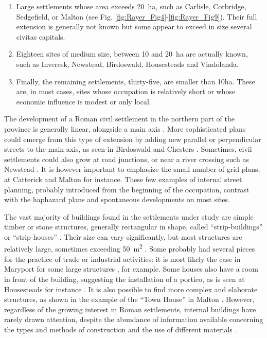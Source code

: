 \begin{enumerate}
	\item Large settlements whose area exceeds \SI{20}{\hectare}, such as Carlisle, Corbridge, Sedgefield, or Malton (see Fig. \ref{fig:Rayer_Fig4}-\ref{fig:Rayer_Fig9}). Their full extension is generally not known but some appear to exceed in size several civitas capitals.
	\item Eighteen sites of medium size, between 10 and \SI{20}{\hectare} are actually known, such as Inveresk, Newstead, Birdoswald, Housesteads and Vindolanda.
	\item Finally, the remaining settlements, thirty-five, are smaller than 10ha. These are, in most cases, sites whose occupation is relatively short or whose economic influence is modest or only local. 
\end{enumerate}

The development of a Roman civil settlement in the northern part of the province is generally linear, alongside a main axis \parencites[234--235]{Burnham_1994}[97]{Sommer_2006}. More sophisticated plans could emerge from this type of extension by adding new parallel or perpendicular streets to the main axis, as seen in Birdoswald \parencite[100]{Biggins_1999} and Chesters \parencite[52]{Joseph_1951}. Sometimes, civil settlements could also grow at road junctions, or near a river crossing such as Newstead \parencite{Hunter_2012}. It is however important to emphasize the small number of grid plans, at Catterick \parencites{Wilson_2002a}{Wilson_2002b} and Malton \parencite{Wenham_1974} for instance. These few examples of internal street planning, probably introduced from the beginning of the occupation, contrast with the haphazard plans and spontaneous developments on most sites.

The vast majority of buildings found in the settlements under study are simple timber or stone structures, generally rectangular in shape, 
called “strip-buildings” or “strip-houses” \parencite[232]{Burnham_1994}. 
Their size can vary significantly, but most structures are relatively large, sometimes exceeding \SI{50}{\metre\squared} \parencite[66]{Osborn_2006}. 
Some probably had several pieces for the practice of trade or industrial activities: it is most likely the case in Maryport for some large structures \parencite[128]{Biggins_2004a}, for example. Some houses also have a room in front of the building, suggesting the installation of a portico, as is seen at Housesteads for instance \parencite[67]{Osborn_2006}. It is also possible to find more complex and elaborate structures, as shown in the example of the “Town House” in Malton \parencite[37]{Wenham_1974}. 
However, regardless of the growing interest in Roman settlements, internal buildings have rarely drawn attention, despite the abundance of information available concerning the types and methods of construction and the use of different materials \parencite[35]{Burnham_1988b}. 

